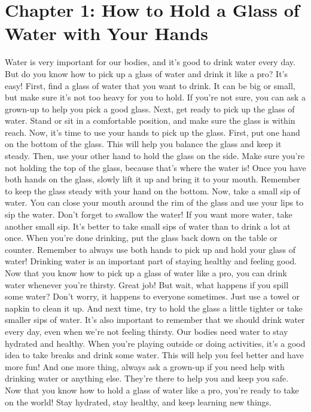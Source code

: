 \chapter{Chapter 1: How to Hold a Glass of Water with Your Hands}

Water is very important for our bodies, and it's good
to drink water every day. But do you know how to pick up a glass of water and
drink it like a pro? It's easy!
First, find a glass of water that you want to drink.
It can be big or small, but make sure it's not too heavy for you to hold. If
you're not sure, you can ask a grown-up to help you pick a good glass.
Next, get ready to pick up the glass of water. Stand
or sit in a comfortable position, and make sure the glass is within reach.
Now, it's time to use your hands to pick up the glass.
First, put one hand on the bottom of the glass. This will help you balance the
glass and keep it steady.
Then, use your other hand to hold the glass on the
side. Make sure you're not holding the top of the glass, because that's where
the water is!
Once you have both hands on the glass, slowly lift it
up and bring it to your mouth. Remember to keep the glass steady with your hand
on the bottom.
Now, take a small sip of water. You can close your
mouth around the rim of the glass and use your lips to sip the water. Don't
forget to swallow the water!
If you want more water, take another small sip. It's
better to take small sips of water than to drink a lot at once.
When you're done drinking, put the glass back down on
the table or counter. Remember to always use both hands to pick up and hold
your glass of water!
Drinking water is an important part of staying healthy
and feeling good. Now that you know how to pick up a glass of water like a pro,
you can drink water whenever you're thirsty. Great job!
But wait, what happens if you spill some water? Don't worry, it happens to everyone sometimes. Just use a towel or napkin to clean it up. And next time, try to hold the glass a little tighter or take smaller sips of water.
It's also important to remember that we should drink
water every day, even when we're not feeling thirsty. Our bodies need water to
stay hydrated and healthy.
When you're playing outside or doing activities, it's
a good idea to take breaks and drink some water. This will help you feel better
and have more fun!
And one more thing, always ask a grown-up if you need
help with drinking water or anything else. They're there to help you and keep
you safe.
Now that you know how to hold a glass of water like a
pro, you're ready to take on the world! Stay hydrated, stay healthy, and keep learning new things.

